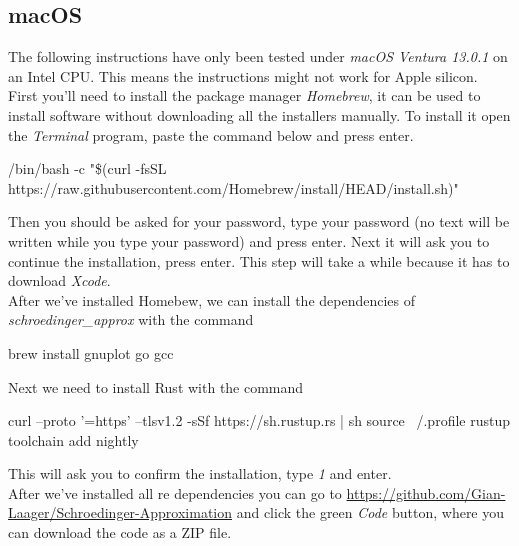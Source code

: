\documentclass[11pt,DIV=10,final]{scrreprt} %
\begin{document}
\begin{appendix}
\subsection{macOS}
The following instructions have only been tested under \emph{macOS Ventura 13.0.1} on an Intel CPU. This means the instructions might not work for Apple silicon.
\\[3ex]
First you'll need to install the package manager \emph{Homebrew}, it can be used to install software without downloading all the installers manually. To install it open the \emph{Terminal} program, paste the command below and press enter.
\begin{bashcode}
/bin/bash -c "\$(curl -fsSL https://raw.githubusercontent.com/Homebrew/install/HEAD/install.sh)"
\end{bashcode}

Then you should be asked for your password, type your password (no text will be written while you type your password) and press enter.
Next it will ask you to continue the installation, press enter. This step will take a while because it has to download \emph{Xcode}.
\\[3ex]
After we've installed Homebew, we can install the dependencies of \emph{schroedinger\_approx} with the command
\begin{bashcode}
brew install gnuplot go gcc
\end{bashcode}
\vspace*{3ex}
Next we need to install Rust with the command
\begin{bashcode}
curl --proto '=https' --tlsv1.2 -sSf https://sh.rustup.rs | sh
source ~/.profile
rustup toolchain add nightly
\end{bashcode}
This will ask you to confirm the installation, type \emph{1} and enter.
\\[3ex]
After we've installed all re dependencies you can go to \url{https://github.com/Gian-Laager/Schroedinger-Approximation} and click the green \emph{Code} button,
where you can download the code as a ZIP file.



\end{appendix}
\end{document}
